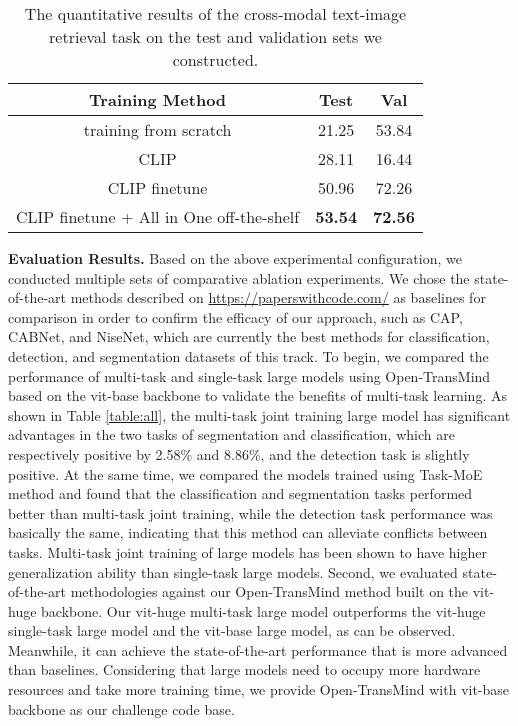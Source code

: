 \documentclass[10pt,twocolumn,letterpaper]{article}
\begin{document}
{\begin{table}[t]
\centering
\begin{tabular}{c|cc}
\hline
Training Method                                  & Test & Val \\ \hline
training from scratch                      & 21.25 & 53.84  \\ 
CLIP                                    & 28.11 & 16.44  \\ 
CLIP finetune                           & 50.96 & 72.26  \\ 
CLIP finetune + All in One off-the-shelf & \textbf{53.54} & \textbf{72.56}  
\\ \hline
\end{tabular}
\caption{The quantitative results of the cross-modal text-image retrieval task on the test and validation sets we constructed.}
\label{table:track2_results}
\end{table}


\textbf{Evaluation Results.}
Based on the above experimental configuration, we conducted multiple sets of comparative ablation experiments. We chose the state-of-the-art methods described on \url{https://paperswithcode.com/} as baselines for comparison in order to confirm the efficacy of our approach, such as CAP, CABNet, and NiseNet, which are currently the best methods for classification, detection, and segmentation datasets of this track. To begin, we compared the performance of multi-task and single-task large models using Open-TransMind based on the vit-base backbone to validate the benefits of multi-task learning. As shown in Table \ref{table:all}, the multi-task joint training large model has significant advantages in the two tasks of segmentation and classification, which are respectively positive by 2.58\% and 8.86\%, and the detection task is slightly positive. At the same time, we compared the models trained using Task-MoE method and found that the classification and segmentation tasks performed better than multi-task joint training, while the detection task performance was basically the same, indicating that this method can alleviate conflicts between tasks. Multi-task joint training of large models has been shown to have higher generalization ability than single-task large models.
Second, we evaluated state-of-the-art methodologies against our Open-TransMind method built on the vit-huge backbone. Our vit-huge multi-task large model outperforms the vit-huge single-task large model and the vit-base large model, as can be observed. Meanwhile, it can achieve the state-of-the-art performance that is more advanced than baselines. Considering that large models need to occupy more hardware resources and take more training time, we provide Open-TransMind with vit-base backbone as our challenge code base.


}
\end{document}
